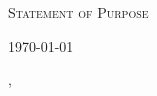 \documentclass[12pt]{letter}
\begin{document}
\AddToShipoutPictureBG*{%
    \color{gr}
    \AtPageUpperLeft{\rule[-1.3in]{\paperwidth}{1.3in}}
}

\begin{center}
  {\fontsize{20}{0}\selectfont\scshape \myname { } \mytitle}

  \vspace{0.15in}
  {\fontsize{25}{0}\selectfont\scshape Statement of Purpose}
  \vspace{0.15in}

  \href{mailto:\myemail}{\faEnvelope\enspace \myemail}\hfill
\href{https://linkedin.com/in/\mylinkedin}{\faLinkedinIn\enspace\mylinkedin}\hfill
\href{https://www.github.com/\mygithub}{\faGithub\enspace\mygithub}\hfill
\href{tel:\myphone}{\faPhone\enspace \myphone}\hfill
\faMapMarker\enspace \mylocation
\end{center}

\vspace{0.2in}

\today\\

\vspace{-0.1in}\setlength\parindent{24pt}
\noindent


\vspace{0.1in}

\vfill

\begin{flushright}
\closer,


\myname\\
\mytitle
\end{flushright}

\printbibliography[heading=none]
\end{document}
